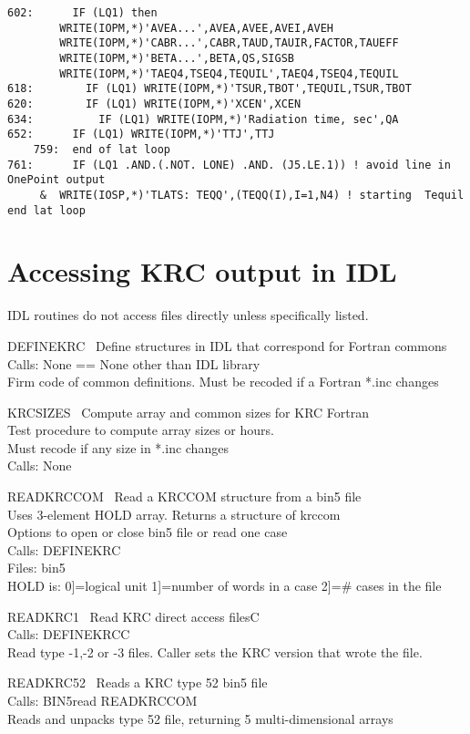 \documentclass{article}
\begin{document}
\begin{verbatim}
602:      IF (LQ1) then
        WRITE(IOPM,*)'AVEA...',AVEA,AVEE,AVEI,AVEH
        WRITE(IOPM,*)'CABR...',CABR,TAUD,TAUIR,FACTOR,TAUEFF
        WRITE(IOPM,*)'BETA...',BETA,QS,SIGSB 
        WRITE(IOPM,*)'TAEQ4,TSEQ4,TEQUIL',TAEQ4,TSEQ4,TEQUIL
618:        IF (LQ1) WRITE(IOPM,*)'TSUR,TBOT',TEQUIL,TSUR,TBOT 
620:        IF (LQ1) WRITE(IOPM,*)'XCEN',XCEN 
634:          IF (LQ1) WRITE(IOPM,*)'Radiation time, sec',QA 
652:      IF (LQ1) WRITE(IOPM,*)'TTJ',TTJ
    759:  end of lat loop
761:      IF (LQ1 .AND.(.NOT. LONE) .AND. (J5.LE.1)) ! avoid line in  OnePoint output
     &  WRITE(IOSP,*)'TLATS: TEQQ',(TEQQ(I),I=1,N4) ! starting  Tequil 
end lat loop
\end{verbatim}

\section{Accessing KRC output in IDL} %

IDL routines do not access files directly unless specifically listed.

DEFINEKRC \ Define structures in IDL that correspond for Fortran commons \\
Calls: None == None other than IDL library \\
Firm code of common definitions. Must be recoded if a Fortran *.inc changes

KRCSIZES \ Compute array and common sizes for KRC Fortran \\
Test procedure to compute array sizes or hours. \\
Must recode if any size in *.inc changes \\
Calls: None

READKRCCOM \ Read a KRCCOM structure from a bin5 file \\
Uses 3-element HOLD array. Returns a structure of krccom \\
Options to open or close bin5 file or read one case  \\
Calls: DEFINEKRC \\
Files: bin5 \\
HOLD is: 0]=logical unit  1]=number of words in a case  2]=\# cases in the file 

READKRC1 \ Read KRC direct access filesC \\
Calls:  DEFINEKRCC \\
Read type -1,-2 or -3 files. Caller sets the KRC version that wrote the file. 

READKRC52 \ Reads a KRC type 52 bin5 file \\
Calls:  BIN5read  READKRCCOM \\
Reads and unpacks type 52 file, returning 5 multi-dimensional arrays
\end{document}
